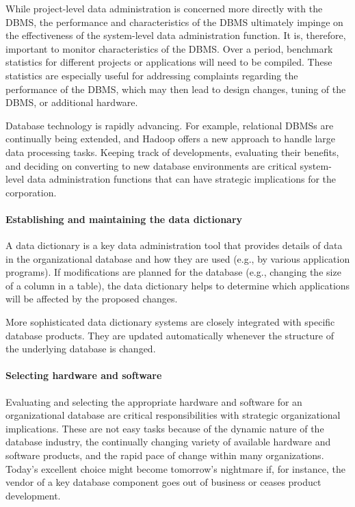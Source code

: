 \documentclass[
]{article}
\begin{document}
While project-level data administration is concerned more directly with
the DBMS, the performance and characteristics of the DBMS ultimately
impinge on the effectiveness of the system-level data administration
function. It is, therefore, important to monitor characteristics of the
DBMS. Over a period, benchmark statistics for different projects or
applications will need to be compiled. These statistics are especially
useful for addressing complaints regarding the performance of the DBMS,
which may then lead to design changes, tuning of the DBMS, or additional
hardware.

Database technology is rapidly advancing. For example, relational DBMSs
are continually being extended, and Hadoop offers a new approach to
handle large data processing tasks. Keeping track of developments,
evaluating their benefits, and deciding on converting to new database
environments are critical system-level data administration functions
that can have strategic implications for the corporation.

\hypertarget{establishing-and-maintaining-the-data-dictionary}{%
\paragraph*{Establishing and maintaining the data dictionary}\label{establishing-and-maintaining-the-data-dictionary}}

A data dictionary is a key data administration tool that provides
details of data in the organizational database and how they are used
(e.g., by various application programs). If modifications are planned
for the database (e.g., changing the size of a column in a table), the
data dictionary helps to determine which applications will be affected
by the proposed changes.

More sophisticated data dictionary systems are closely integrated with
specific database products. They are updated automatically whenever the
structure of the underlying database is changed.

\hypertarget{selecting-hardware-and-software}{%
\paragraph*{Selecting hardware and software}\label{selecting-hardware-and-software}}

Evaluating and selecting the appropriate hardware and software for an
organizational database are critical responsibilities with strategic
organizational implications. These are not easy tasks because of the
dynamic nature of the database industry, the continually changing
variety of available hardware and software products, and the rapid pace
of change within many organizations. Today's excellent choice might
become tomorrow's nightmare if, for instance, the vendor of a key
database component goes out of business or ceases product development.
\end{document}
